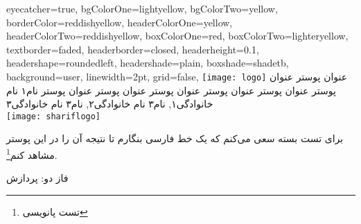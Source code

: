 \documentclass[debug,a0paper,portrait,persian]{xebaposter}
\begin{document}
      \begin{poster}%
      {
      eyecatcher=true,
      bgColorOne=lightyellow,
      bgColorTwo=yellow,
      borderColor=reddishyellow,
      headerColorOne=yellow,
      headerColorTwo=reddishyellow,
      boxColorOne=red,
      boxColorTwo=lighteryellow,
      textborder=faded,
      headerborder=closed,
      headerheight=0.1\textheight,
      headershape=roundedleft,
      headershade=plain,
      boxshade=shadetb,%
      background=user,%
      linewidth=2pt,
      grid=false,
      }
 {
      \texttt{[image: logo]}
 }
 {عنوان پوستر عنوان پوستر عنوان پوستر عنوان پوستر عنوان پوستر عنوان پوستر عنوان پوستر 
}
 {\large نام۱ نام خانوادگی۱, نام۳ نام خانوادگی۲, نام۳ نام خانوادگی۳ 
 \\%
 {\normalsize\texttt{}}}
 {
    \texttt{[image: shariflogo]}
 }


\begin{posterbox}[name=introduction,column=0,row=0]{}
برای تست بسته سعی می‌کنم که یک خط فارسی بنگارم تا نتیجه آن را در این پوستر مشاهد کنم\footnote{تست پانویسی}.
\end{posterbox}
\begin{posterbox}[name=phase2,column=1,span=1]{فاز دو: پردازش}


\end{posterbox}
\end{poster}
\end{document}
